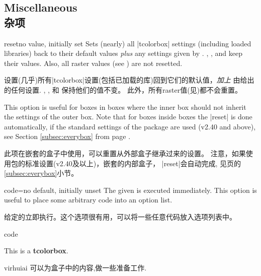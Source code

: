 \subsection{Miscellaneous\\杂项}

\begin{docTcbKey}{reset}{}{no value, initially set}
Sets (nearly) all |tcolorbox| settings (including loaded libraries) back to their default values
\emph{plus} any settings given by .
, , and
 keep their values.
Also, all raster values (see ) are not resetted.

设置(几乎)所有|tcolorbox|设置(包括已加载的库)回到它们的默认值，\emph{加上} 由给出的任何设置.%
, , 和  保持他们的值不变。%
此外，所有raster值(见)都不会重置。

This option is useful for boxes in boxes where the inner box should not inherit
the settings of the outer box.
Note that for boxes inside boxes the |reset| is done automatically, if the
standard settings of the package are used (v2.40 and above), see
Section \ref{subsec:everybox} from page \pageref{subsec:everybox}.

此项在嵌套的盒子中使用，可以重置从外部盒子继承过来的设置。%
注意，如果使用包的标准设置(v2.40及以上)，嵌套的内部盒子， |reset|会自动完成, 见\pageref{subsec:everybox}页的\ref{subsec:everybox}小节。
\end{docTcbKey}




\begin{docTcbKey}{code}{=}{no default, initially unset}
The given  is executed immediately. This option is useful
to place some arbitrary code into an option list.

给定的立即执行。这个选项很有用，可以将一些任意代码放入选项列表中。
\begin{exdispExample}{code}

\begin{tcolorbox}[code={\newcommand{\mycommand}{\textit{working}}},
title=My \mycommand\ title]
This is a \textbf{tcolorbox}.
\end{tcolorbox}
\end{exdispExample}

\begin{引述之言}{virhuiai}
可以为盒子中的内容,做一些准备工作.
\end{引述之言}
\end{docTcbKey}



